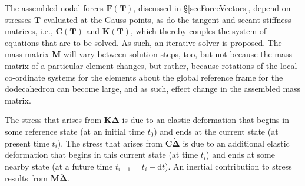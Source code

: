 The assembled nodal forces $\boldsymbol{F}(\boldsymbol{T})$, discussed in \S\ref{secForceVectors}, depend on stresses $\boldsymbol{T}$ evaluated at the Gauss points, as do the tangent and secant stiffness matrices, i.e., $\mathbf{C}(\boldsymbol{T})$ and $\mathbf{K}(\boldsymbol{T})$, which thereby couples the system of equations that are to be solved. As such, an iterative solver is proposed.  The mass matrix $\mathbf{M}$ will vary between solution steps, too, but not because the mass matrix of a particular element changes, but rather, because rotations of the local co-ordinate systems for the elements about the global reference frame for the dodecahedron can become large, and as such, effect change in the assembled mass matrix.

The stress that arises from $\mathbf{K} \boldsymbol{\Delta}$ is due to an elastic deformation that begins in some reference state (at an initial time $t_0$) and ends at the current state (at present time $t_i$).  The stress that arises from $\mathbf{C} \dot{\boldsymbol{\Delta}}$ is due to an additional elastic deformation that begins in this current state (at time $t_i$) and ends at some nearby state (at a future time $t_{i+1} = t_i + \mathrm{d}t$).  An inertial contribution to stress results from $\mathbf{M} \ddot{\boldsymbol{\Delta}}$.

